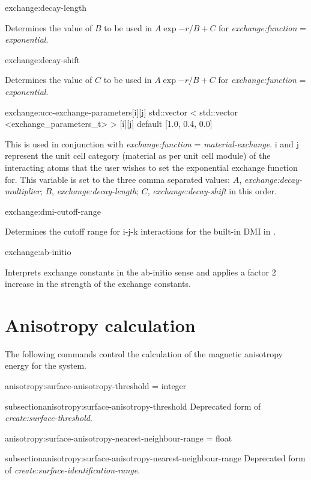 {\zicf exchange:decay-length}
Determines the value of $B$ to be used in $A\exp{-r/B}+C$ for
\textit{exchange:function} = \textit{exponential}.

{\zicf exchange:decay-shift}
Determines the value of $C$ to be used in $A\exp{-r/B}+C$ for
\textit{exchange:function} = \textit{exponential}.

{\zicf exchange:ucc-exchange-parameters[i][j]\newline
std::vector < std::vector <exchange\_parameters\_t> > [i][j]\newline
default [1.0, 0.4, 0.0]}
This is used in conjunction with \textit{exchange:function} =
\textit{material-exchange}. i and j represent the unit cell category (material
as per unit cell module) of the interacting atoms that the user wishes to set
the exponential exchange function for. This variable is set to the three comma
separated values: $A$, \textit{exchange:decay-multiplier}; $B$,
\textit{exchange:decay-length}; $C$, \textit{exchange:decay-shift} in this order.

{\zicf exchange:dmi-cutoff-range}
Determines the cutoff range for i-j-k interactions for the built-in DMI in \vampire.

{\zicf exchange:ab-initio}
Interprets exchange constants in the ab-initio sense and applies a factor 2 increase
in the strength of the exchange constants.\\

\section*{Anisotropy calculation}
The following commands control the calculation of the magnetic anisotropy energy
for the system.

{\zicf anisotropy:surface-anisotropy-threshold = integer}
{subsection}{anisotropy:surface-anisotropy-threshold} Deprecated form of
\textit{create:surface-threshold}.

{\zicf anisotropy:surface-anisotropy-nearest-neighbour-range = float}
{subsection}{anisotropy:surface-anisotropy-nearest-neighbour-range} Deprecated
form of \textit{create:surface-identification-range}.

